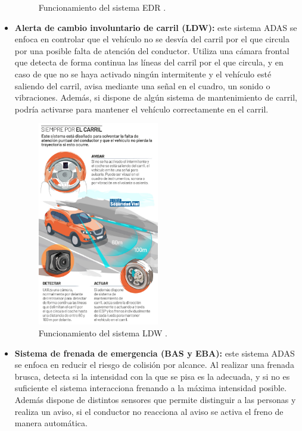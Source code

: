 \documentclass[12pt]{report} %
\begin{document}
\begin{itemize}
\begin{figure}[H]
		\caption{Funcionamiento del sistema EDR \cite{adasObligatorios}.}
		\label{fig:imagen14}
	\end{figure}
	\item \textbf{Alerta de cambio involuntario de carril (LDW):} este sistema ADAS se enfoca en controlar que el vehículo no se desvía del carril por el que circula por una posible falta de atención del conductor. Utiliza una cámara frontal que detecta de forma continua las líneas del carril por el que circula, y en caso de que no se haya activado ningún intermitente y el vehículo esté saliendo del carril, avisa mediante una señal en el cuadro, un sonido o vibraciones. Además, si dispone de algún sistema de mantenimiento de carril, podría activarse para mantener el vehículo correctamente en el carril.
    \begin{figure}[H]
		\centering
		\includegraphics[width=0.5\textwidth]{adasLDW.jpg}
		\caption{Funcionamiento del sistema LDW \cite{adasObligatorios}.}
		\label{fig:imagen15}
	\end{figure}
	\item \textbf{Sistema de frenada de emergencia (BAS y EBA):} este sistema ADAS se enfoca en reducir el riesgo de colisión por alcance. Al realizar una frenada brusca, detecta si la intensidad con la que se pisa es la adecuada, y si no es suficiente el sistema interacciona frenando a la máxima intensidad posible. Además dispone de distintos sensores que permite distinguir a las personas y realiza un aviso, si el conductor no reacciona al aviso se activa el freno de manera automática.

\end{itemize}
\end{document}
